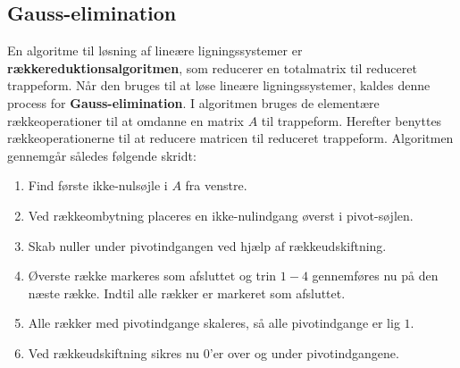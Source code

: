 \subsection{Gauss-elimination}
\label{gauss}
En algoritme til løsning af lineære ligningssystemer er  \textbf{rækkereduktionsalgoritmen}, som reducerer en totalmatrix til reduceret trappeform.
Når den bruges til at løse lineære ligningssystemer, kaldes denne process for \textbf{Gauss-elimination}.
I algoritmen bruges de elementære rækkeoperationer til at omdanne en matrix $A$ til trappeform. 
Herefter benyttes rækkeoperationerne til at reducere matricen til reduceret trappeform.
Algoritmen gennemgår således følgende skridt:
%
\begin{enumerate}
\item Find første ikke-nulsøjle i $A$ fra venstre.
\item Ved rækkeombytning placeres en ikke-nulindgang øverst i pivot-søjlen.
\item Skab nuller under pivotindgangen ved hjælp af rækkeudskiftning.
\item Øverste række markeres som afsluttet og trin $1-4$ gennemføres nu på den næste række. Indtil alle rækker er markeret som afsluttet.
\item Alle rækker med pivotindgange skaleres, så alle pivotindgange er lig $1$.
\item Ved rækkeudskiftning sikres nu $0$'er over og under pivotindgangene.
\end{enumerate}
%
